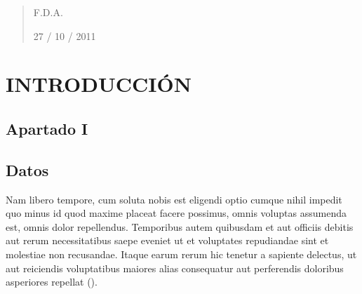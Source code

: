     \begin{abstract}
    
            \lipsum[1-3] %
    
    
                \hfill F.D.A.  %
                
                \hfill 27 / 10 / 2011 %
    
            \thispagestyle{empty} %
    \end{abstract}
    
\clearpage %




\section{INTRODUCCIÓN} %

\subsection*{Apartado I} %
 \lipsum[1-4]  %

\subsection*{Datos} 
 \lipsum[1]  Nam libero tempore, cum soluta nobis est eligendi optio cumque nihil impedit quo minus id quod maxime placeat facere possimus, omnis voluptas assumenda est, omnis dolor repellendus. Temporibus autem quibusdam et aut officiis debitis aut rerum necessitatibus saepe eveniet ut et voluptates repudiandae sint et molestiae non recusandae. Itaque earum rerum hic tenetur a sapiente delectus, ut aut reiciendis voluptatibus maiores alias consequatur aut perferendis doloribus asperiores repellat (\citealp{dunning_design-based_2010,brady_rethinking_2010,calvo_ballot_2009}).  %

\lipsum[1]

